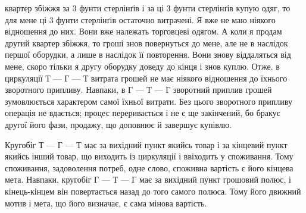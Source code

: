 \parcont{}  %
квартер збіжжя за 3 фунти стерлінґів і за ці 3 фунти стерлінґів
купую одяг, то для мене ці 3 фунти стерлінґів остаточно витрачені.
Я вже не маю ніякого відношення до них. Вони вже належать
торговцеві одягом. А коли я продам другий квартер збіжжя,
то гроші знов повернуться до мене, але не в наслідок першої
оборудки, а лише в наслідок її повторення. Вони знову віддаляться
від мене, скоро тільки я другу оборудку доведу до кінця
і знов куплю. Отже, в циркуляції Т — Г — Т витрата грошей
не має ніякого відношення до їхнього зворотного припливу. Навпаки,
в Г — Т — Г зворотний приплив грошей зумовлюється
характером самої їхньої витрати. Без цього зворотного припливу
операція не вдається; процес переривається і не є ще закінчений,
бо бракує другої його фази, продажу, що доповнює й завершує
купівлю.

Кругобіг Т — Г — Т має за вихідний пункт якийсь товар і
за кінцевий пункт якийсь інший товар, що виходить із циркуляції
і ввіходить у споживання. Тому споживання, задоволення
потреб, одне слово, споживна вартість є його кінцева мета.
Навпаки, кругобіг Г — Т — Г має за вихідний пункт грошовий
полюс, і кінець-кінцем він повертається назад до того самого
полюса. Тому його движний мотив і мета, що його визначає, є
сама мінова вартість.

